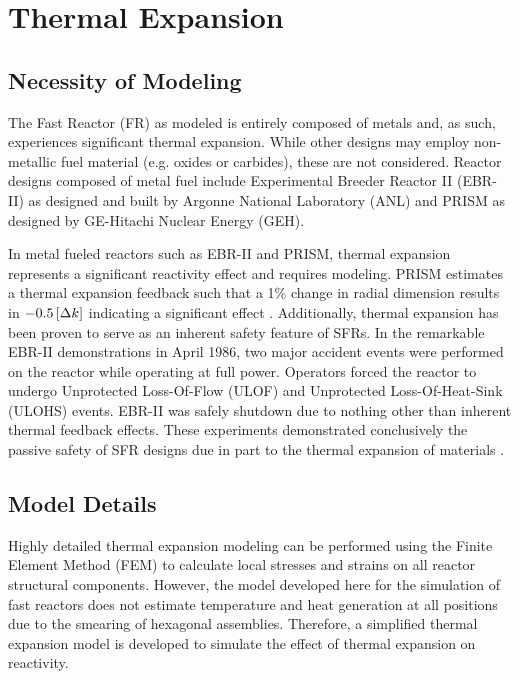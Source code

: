 \chapter{Thermal Expansion}
\label{ch:thermalExpansion}

\section{Necessity of Modeling}
  The Fast Reactor (FR) as modeled is entirely composed of
  metals and, as such, experiences significant thermal expansion. While other 
  designs may employ non-metallic fuel material (e.g. oxides or carbides), these 
  are not considered. Reactor designs composed of metal fuel include 
  Experimental Breeder Reactor II (EBR-II) as designed and built by Argonne 
  National Laboratory (ANL) and PRISM as designed by GE-Hitachi Nuclear Energy 
  (GEH).

  In metal fueled reactors such as EBR-II and PRISM, thermal expansion 
  represents a significant reactivity effect and requires modeling. PRISM 
  estimates a thermal expansion feedback such that a 1\% change in radial 
  dimension results in $-0.5 \left[\text{{$\Delta k$}}\right]$ indicating a significant effect 
  \cite{GEFR793}. Additionally, thermal expansion has been proven to serve as an 
  inherent safety feature of SFRs. In the remarkable EBR-II demonstrations in 
  April 1986, two major accident events were performed on the reactor while 
  operating at full power. Operators forced the reactor to undergo Unprotected 
  Loss-Of-Flow (ULOF) and Unprotected Loss-Of-Heat-Sink (ULOHS) events. EBR-II 
  was safely shutdown due to nothing other than inherent thermal feedback 
  effects. These experiments demonstrated conclusively the passive safety of SFR
  designs due in part to the thermal expansion of materials 
  \cite{PlentifulEnergy}.

\section{Model Details}
  \label{sec:model_details}
  Highly detailed thermal expansion modeling can be performed using the Finite
  Element Method (FEM) to calculate local stresses and strains on all reactor
  structural components. However, the model developed here for the simulation of
  fast reactors does not estimate temperature and heat generation at all 
  positions due to the smearing of hexagonal assemblies. Therefore, a simplified 
  thermal expansion model is developed to simulate the effect of thermal 
  expansion on reactivity.


